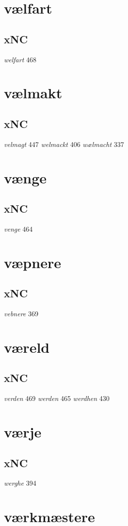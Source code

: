 \documentclass[a4paper,twocolumn]{article}
\begin{document}
\section{vælfart}
\label{sec:org1fc99bb}
\subsection{xNC}
\label{sec:orge62e751}
\emph{welfart} 468 
\section{vælmakt}
\label{sec:org5f3ed0d}
\subsection{xNC}
\label{sec:org3749e70}
\emph{velmagt} 447 \emph{welmackt} 406 \emph{wælmacht} 337 
\section{vænge}
\label{sec:orgf7b5c73}
\subsection{xNC}
\label{sec:orgffbb91e}
\emph{venge} 464 
\section{væpnere}
\label{sec:orge55655b}
\subsection{xNC}
\label{sec:org2673fc9}
\emph{vebnere} 369 
\section{væreld}
\label{sec:org9baaad7}
\subsection{xNC}
\label{sec:org86257f6}
\emph{verden} 469 \emph{werden} 465 \emph{werdhen} 430 
\section{værje}
\label{sec:org6cc4fa7}
\subsection{xNC}
\label{sec:org29a7e81}
\emph{werghe} 394 
\section{værkmæstere}
\label{sec:org08f18d9}
\end{document}
